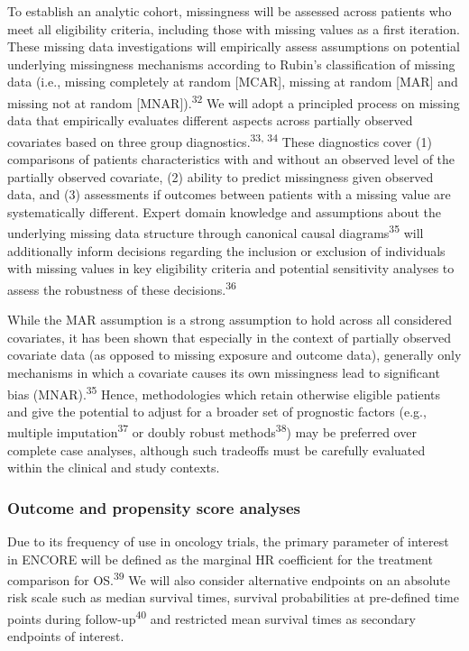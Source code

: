 \documentclass[
  letterpaper,
  DIV=11,
  numbers=noendperiod]{scrartcl}
\begin{document}
To establish an analytic cohort, missingness will be assessed across
patients who meet all eligibility criteria, including those with missing
values as a first iteration. These missing data investigations will
empirically assess assumptions on potential underlying missingness
mechanisms according to Rubin's classification of missing data (i.e.,
missing completely at random {[}MCAR{]}, missing at random {[}MAR{]} and
missing not at random {[}MNAR{]}).\textsuperscript{32} We will adopt a
principled process on missing data that empirically evaluates different
aspects across partially observed covariates based on three group
diagnostics.\textsuperscript{33, 34} These diagnostics cover (1)
comparisons of patients characteristics with and without an observed
level of the partially observed covariate, (2) ability to predict
missingness given observed data, and (3) assessments if outcomes between
patients with a missing value are systematically different. Expert
domain knowledge and assumptions about the underlying missing data
structure through canonical causal diagrams\textsuperscript{35} will
additionally inform decisions regarding the inclusion or exclusion of
individuals with missing values in key eligibility criteria and
potential sensitivity analyses to assess the robustness of these
decisions.\textsuperscript{36}

While the MAR assumption is a strong assumption to hold across all
considered covariates, it has been shown that especially in the context
of partially observed covariate data (as opposed to missing exposure and
outcome data), generally only mechanisms in which a covariate causes its
own missingness lead to significant bias (MNAR).\textsuperscript{35}
Hence, methodologies which retain otherwise eligible patients and give
the potential to adjust for a broader set of prognostic factors (e.g.,
multiple imputation\textsuperscript{37} or doubly robust
methods\textsuperscript{38}) may be preferred over complete case
analyses, although such tradeoffs must be carefully evaluated within the
clinical and study contexts.

\subsubsection{Outcome and propensity score
analyses}\label{outcome-and-propensity-score-analyses}

Due to its frequency of use in oncology trials, the primary parameter of
interest in ENCORE will be defined as the marginal HR coefficient for
the treatment comparison for OS.\textsuperscript{39} We will also
consider alternative endpoints on an absolute risk scale such as median
survival times, survival probabilities at pre-defined time points during
follow-up\textsuperscript{40} and restricted mean survival times as
secondary endpoints of interest.
\end{document}
